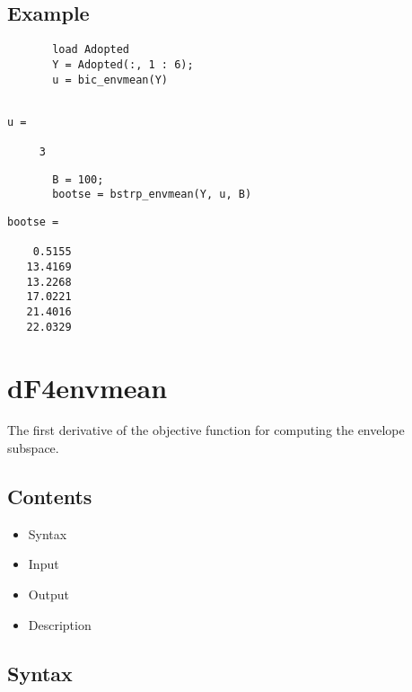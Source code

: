 \documentclass[a4paper,11pt,openany]{memoir}
\begin{document}
\subsection*{Example}


\begin{verbatim}       load Adopted
       Y = Adopted(:, 1 : 6);
       u = bic_envmean(Y)\end{verbatim}
    
        \color{lightgray} \ttfamily\begin{verbatim}
       
u =

     3
\end{verbatim} \rmfamily
\color{black}       
\begin{verbatim}       B = 100;
       bootse = bstrp_envmean(Y, u, B)\end{verbatim}
    
        \color{lightgray}\ttfamily \begin{verbatim}
bootse =

    0.5155
   13.4169
   13.2268
   17.0221
   21.4016
   22.0329

\end{verbatim} \rmfamily
\color{black}
    


\newpage

\rmfamily
\color{black}\section{dF4envmean}

\begin{par}
The first derivative of the objective function for computing the envelope subspace.
\end{par} \vspace{1em}

\subsection*{Contents}

\begin{itemize}
\setlength{\itemsep}{-1ex}
   \item Syntax
   \item Input
   \item Output
   \item Description
\end{itemize}


\subsection*{Syntax}
\end{document}
